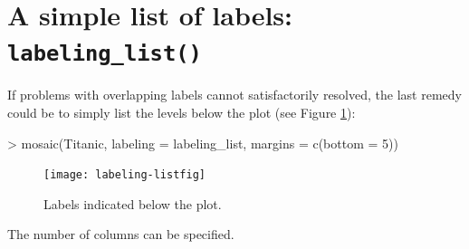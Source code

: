 \documentclass[a4paper]{article}
\begin{document}
\section{A simple list of labels: \texttt{labeling\_list()}}

If problems with overlapping labels cannot satisfactorily resolved,
the last remedy could be to simply list the levels below the plot
(see Figure \ref{fig:list}):

\begin{Schunk}
\begin{Sinput}
> mosaic(Titanic, labeling = labeling_list, margins = c(bottom = 5))
\end{Sinput}
\end{Schunk}

\begin{figure}[h]
\begin{center}
\texttt{[image: labeling-listfig]}
\caption{Labels indicated below the plot.}
\label{fig:list}
\end{center}
\end{figure}

\noindent The number of columns can be specified.
\end{document}
